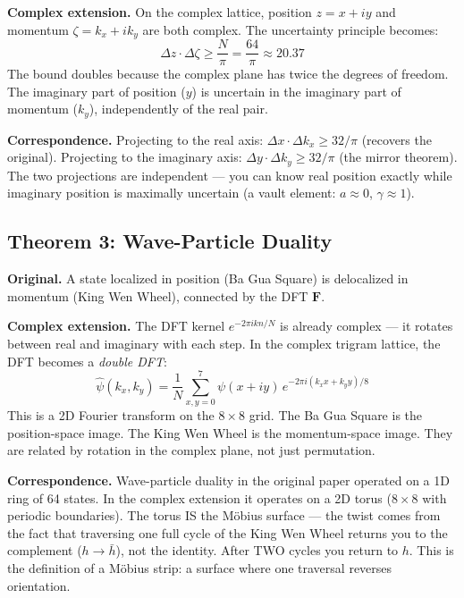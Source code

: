 \documentclass[12pt,a4paper]{article}
\theoremstyle{definition}
\theoremstyle{remark}
\begin{document}
\medskip\noindent\textbf{Complex extension.}
On the complex lattice, position $z = x + iy$ and momentum
$\zeta = k_x + ik_y$ are both complex. The uncertainty principle
becomes:
\begin{equation}\label{eq:complex-uncertainty}
  \Delta z \cdot \Delta \zeta \geq \frac{N}{\pi}
  = \frac{64}{\pi} \approx 20.37
\end{equation}
The bound doubles because the complex plane has twice the degrees of
freedom. The imaginary part of position ($y$) is uncertain in the
imaginary part of momentum ($k_y$), independently of the real pair.

\medskip\noindent\textbf{Correspondence.}
Projecting to the real axis: $\Delta x \cdot \Delta k_x \geq 32/\pi$
(recovers the original). Projecting to the imaginary axis:
$\Delta y \cdot \Delta k_y \geq 32/\pi$ (the mirror theorem). The two
projections are independent --- you can know real position exactly while
imaginary position is maximally uncertain (a vault element: $a \approx 0$,
$\gamma \approx 1$).

\bigskip

\subsection{Theorem 3: Wave-Particle Duality}

\noindent\textbf{Original.}
A state localized in position (Ba Gua Square) is delocalized in momentum
(King Wen Wheel), connected by the DFT $\mathbf{F}$.

\medskip\noindent\textbf{Complex extension.}
The DFT kernel $e^{-2\pi i kn/N}$ is already complex --- it rotates between
real and imaginary with each step. In the complex trigram lattice, the DFT
becomes a \emph{double DFT}:
\begin{equation}
  \hat{\psi}(k_x, k_y) = \frac{1}{N} \sum_{x,y=0}^{7}
  \psi(x + iy) \, e^{-2\pi i (k_x x + k_y y) / 8}
\end{equation}
This is a 2D Fourier transform on the $8 \times 8$ grid. The Ba Gua Square
is the position-space image. The King Wen Wheel is the
momentum-space image. They are related by rotation in the complex plane,
not just permutation.

\medskip\noindent\textbf{Correspondence.}
Wave-particle duality in the original paper operated on a 1D ring of 64
states. In the complex extension it operates on a 2D torus ($8 \times 8$
with periodic boundaries). The torus IS the Möbius surface --- the twist
comes from the fact that traversing one full cycle of the King Wen Wheel
returns you to the complement ($h \to \bar{h}$), not the identity. After
TWO cycles you return to $h$. This is the definition of a Möbius strip:
a surface where one traversal reverses orientation.
\end{document}
